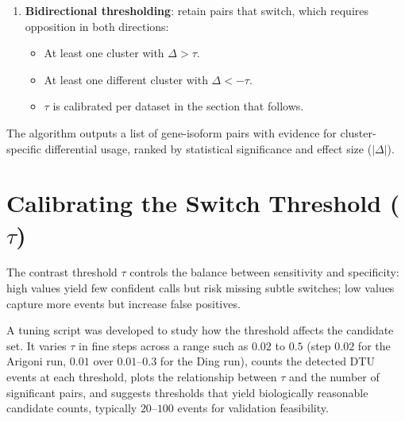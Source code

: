 \begin{enumerate}
    \item \textbf{Bidirectional thresholding}: retain pairs that switch, which requires opposition in both directions:
    \begin{itemize}
        \item At least one cluster with $\Delta > \tau$.
        \item At least one different cluster with $\Delta < -\tau$.
        \item {} $\tau$ is calibrated per dataset in the section that follows.
    \end{itemize}
\end{enumerate}

The algorithm outputs a list of gene-isoform pairs with evidence for cluster-specific differential usage, ranked by statistical significance and effect size ($|\Delta|$).

\section{Calibrating the Switch Threshold \texorpdfstring{($\tau$)}{(tau)}}\label{sec:tuning-tau}

The contrast threshold $\tau$ controls the balance between sensitivity and specificity: high values yield few confident calls but risk missing subtle switches; low values capture more events but increase false positives.

A tuning script was developed to study how the threshold affects the candidate set. It varies $\tau$ in fine steps across a range such as $0.02$ to $0.5$ (step $0.02$ for the Arigoni run, $0.01$ over $0.01$--$0.3$ for the Ding run), counts the detected DTU events at each threshold, plots the relationship between $\tau$ and the number of significant pairs, and suggests thresholds that yield biologically reasonable candidate counts, typically $20$--$100$ events for validation feasibility.
